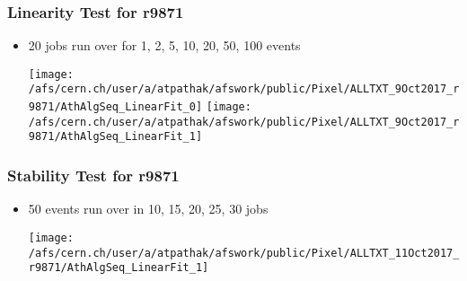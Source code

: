 \documentclass{beamer}
\begin{document}
\begin{frame}
\frametitle{Linearity Test for r9871}

\begin{normalsize}
\begin{itemize}
\vspace*{-.5cm}
\item 20 jobs run over for 1, 2, 5, 10, 20, 50, 100 events \\
\begin{center}
\texttt{[image: /afs/cern.ch/user/a/atpathak/afswork/public/Pixel/ALLTXT\_9Oct2017\_r9871/AthAlgSeq\_LinearFit\_0]} 
\texttt{[image: /afs/cern.ch/user/a/atpathak/afswork/public/Pixel/ALLTXT\_9Oct2017\_r9871/AthAlgSeq\_LinearFit\_1]}
\end{center}

\end{itemize}
\end{normalsize}

\end{frame}
\begin{frame}
\frametitle{Stability Test for r9871}

\begin{normalsize}
\begin{itemize}
\vspace*{-.5cm}
\item 50 events run over in 10, 15, 20, 25, 30 jobs \\
\begin{center}
\texttt{[image: /afs/cern.ch/user/a/atpathak/afswork/public/Pixel/ALLTXT\_11Oct2017\_r9871/AthAlgSeq\_LinearFit\_1]} 

\end{center}

\end{itemize}
\end{normalsize}

\end{frame}
\end{document}
